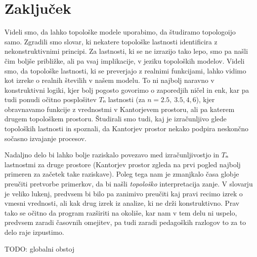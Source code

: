 \section{Zaključek}

Videli smo, da lahko topološke modele uporabimo, da študiramo topologoijo samo.
Zgradili smo slovar, ki nekatere topološke lastnosti identificira z
nekonstruktivnimi principi. Za lastnosti, ki se ne izrazijo tako lepo, smo pa
našli čim boljše približke, ali pa vsaj implikacije, v jeziku topoloških
modelov. Videli smo, da topološke lastnosti, ki se preverjajo z realnimi
funkcijami, lahko vidimo kot izreke o realnih številih v našem modelu. To ni
najbolj naravno v konstruktivni logiki, kjer bolj pogosto govorimo o zaporedjih
ničel in enk, kar pa tudi ponudi očitno posplošitev \(Tₙ\) lastnosti
(za \(n = 2.5,~3.5,4,6\)), kjer obravnavamo funkcije z vrednostmi v Kantorjevem
prostoru, ali pa katerem drugem topološkem prostoru. Študirali smo tudi, kaj je
izračunljivo glede topoloških lastnosti in spoznali, da Kantorjev prostor nekako
podpira neskončno sočasno izvajanje procesov.

Nadaljno delo bi lahko bolje raziskalo povezavo med izračunljivostjo in \(Tₙ\)
lastnostmi za druge prostore (Kantorjev prostor zgleda na prvi pogled najbolj
primeren za začetek take raziskave). Poleg tega nam je zmanjkalo časa globje
preučiti pretvorbe primerkov, da bi našli \emph{topološko} interpretacija zanje.
V slovarju je veliko lukenj, predvsem bi bilo pa zanimivo preučiti kaj pravi
recimo izrek o vmesni vrednosti, ali kak drug izrek iz analize, ki ne drži
konstruktivno. Prav tako se očitno da program razširiti na okoliše, kar nam v
tem delu ni uspelo, predvsem zaradi časovnih omejitev, pa tudi zaradi pedagoških
razlogov to za to delo raje izpustimo.

TODO: globalni obstoj



